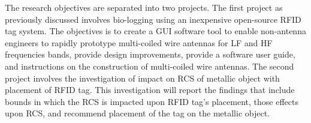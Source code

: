 The research objectives are separated into two projects. The first project as previously discussed involves bio-logging using an inexpensive open-source RFID tag system. The objectives is to create a GUI software tool to enable non-antenna engineers to rapidly prototype multi-coiled wire antennas for LF and HF frequencies bands, provide design improvements, provide a software user guide, and instructions on the construction of multi-coiled wire antennas. The second project involves the investigation of impact on RCS of metallic object with placement of RFID tag. This investigation will report the findings that include bounds in which the RCS is impacted upon RFID tag's placement, those effects upon RCS, and recommend placement of the tag on the metallic object.   